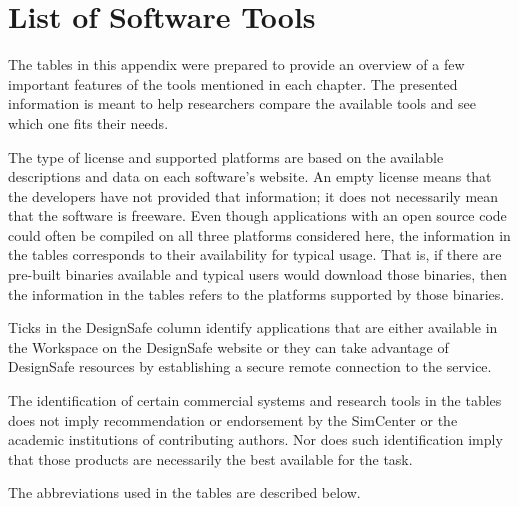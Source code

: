 
\chapter{List of Software Tools}

The tables in this appendix were prepared to provide an overview of a few important features of the tools mentioned in each chapter. The presented information is meant to help researchers compare the available tools and see which one fits their needs. 


The type of license and supported platforms are based on the available descriptions and data on each software's website. An empty license means that the developers have not provided that information; it does not necessarily mean that the software is freeware. Even though applications with an open source code could often be compiled on all three platforms considered here, the information in the tables corresponds to their availability for typical usage. That is, if there are pre-built binaries available and typical users would download those binaries, then the information in the tables refers to the platforms supported by those binaries.


Ticks in the DesignSafe column identify applications that are either available in the Workspace on the DesignSafe website or they can take advantage of DesignSafe resources by establishing a secure remote connection to the service. 


The identification of certain commercial systems and research tools in the tables does not imply recommendation or endorsement by the SimCenter or the academic institutions of contributing authors. Nor does such identification imply that those products are necessarily the best available for the task.


The abbreviations used in the tables are described below.




